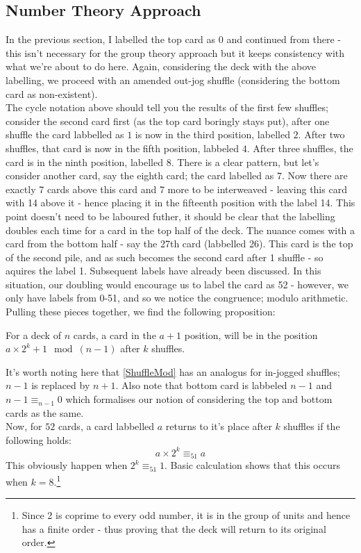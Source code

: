 \documentclass[../Axiomathic.tex]{subfiles}
\begin{document}
\subsection{Number Theory Approach}
In the previous section, I labelled the top card as $0$ and continued from there - this isn't necessary for the group theory approach but it keeps consistency with what we're about to do here. Again, considering the deck with the above labelling, we proceed with an amended out-jog shuffle (considering the bottom card as non-existent).\\
The cycle notation above should tell you the results of the first few shuffles; consider the second card first (as the top card boringly stays put), after one shuffle the card labbelled as $1$ is now in the third position, labelled $2$. After two shuffles, that card is now in the fifth position, labbeled $4$. After three shuffles, the card is in the ninth position, labelled $8$. There is a clear pattern, but let's consider another card, say the eighth card; the card labelled as $7$. Now there are exactly 7 cards above this card and 7 more to be interweaved - leaving this card with 14 above it - hence placing it in the fifteenth position with the label 14. This point doesn't need to be laboured futher, it should be clear that the labelling doubles each time for a card in the top half of the deck. The nuance comes with a card from the bottom half - say the 27th card (labbelled 26). This card is the top of the second pile, and as such becomes the second card after 1 shuffle - so aquires the label 1. Subsequent labels have already been discussed. In this situation, our doubling would encourage us to label the card as 52 - however, we only have labels from 0-51, and so we notice the congruence; modulo arithmetic. Pulling these pieces together, we find the following proposition:\\
\begin{prop} \label{ShuffleMod} For a deck of $n$ cards, a card in the $a+1$ position, will be in the position $a \times 2^k+1 \mod(n-1)$ after $k$ shuffles. \end{prop}

It's worth noting here that \ref{ShuffleMod} has an analogus for in-jogged shuffles; $n-1$ is replaced by $n+1$. Also note that bottom card is labbeled $n-1$ and $n-1 \equiv_{n-1}0$ which formalises our notion of considering the top and bottom cards as the same. \\
Now, for $52$ cards, a card labbelled $a$ returns to it's place after $k$ shuffles if the following holds: \[ a \times 2^k \equiv_{51} a\] This obviously happen when $2^k \equiv_{51} 1$. Basic calculation shows that this occurs when $k=8$.\footnote{Since 2 is coprime to every odd number, it is in the group of units and hence has a finite order - thus proving that the deck will return to its original order.}
\end{document}
